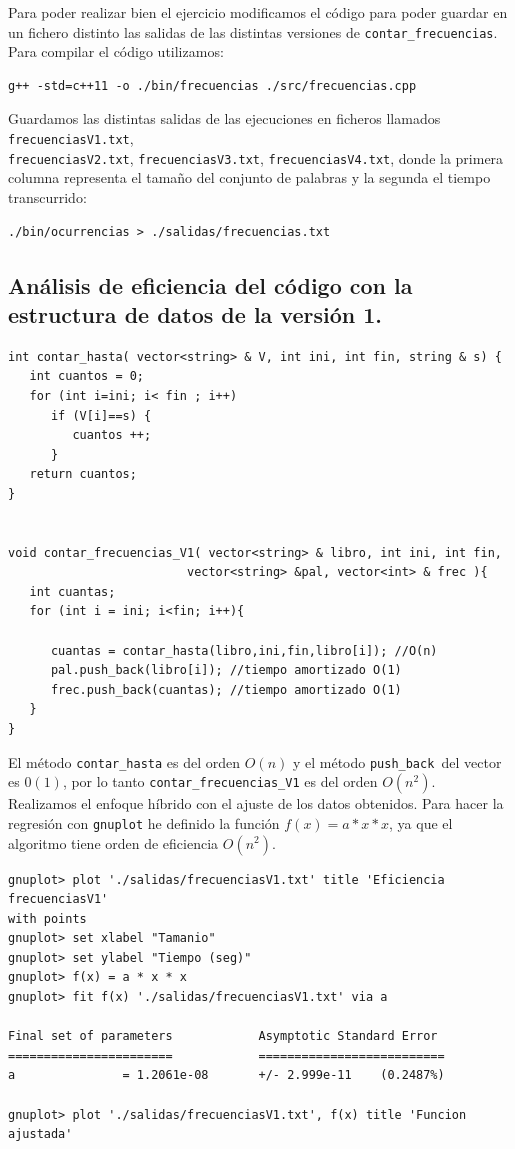 \documentclass[11pt]{article}
\begin{document}
Para poder realizar bien el ejercicio modificamos el código para poder guardar en un fichero distinto las salidas de las distintas versiones de \texttt{contar\_frecuencias}. Para compilar el código utilizamos:
\begin{verbatim}
g++ -std=c++11 -o ./bin/frecuencias ./src/frecuencias.cpp 
\end{verbatim}

Guardamos las distintas salidas de las ejecuciones en ficheros llamados \texttt{frecuenciasV1.txt},\\ \texttt{frecuenciasV2.txt}, \texttt{frecuenciasV3.txt}, \texttt{frecuenciasV4.txt}, donde la primera columna representa el tamaño del conjunto de palabras y la segunda el tiempo transcurrido:
\begin{verbatim}
./bin/ocurrencias > ./salidas/frecuencias.txt
\end{verbatim}

\subsection{Análisis de eficiencia del código con la estructura de datos de la versión 1.}

\begin{verbatim}
int contar_hasta( vector<string> & V, int ini, int fin, string & s) {
   int cuantos = 0;
   for (int i=ini; i< fin ; i++)
      if (V[i]==s) {
         cuantos ++;
      }
   return cuantos;
}


void contar_frecuencias_V1( vector<string> & libro, int ini, int fin,
                         vector<string> &pal, vector<int> & frec ){
   int cuantas;
   for (int i = ini; i<fin; i++){

      cuantas = contar_hasta(libro,ini,fin,libro[i]); //O(n)
      pal.push_back(libro[i]); //tiempo amortizado O(1)
      frec.push_back(cuantas); //tiempo amortizado O(1)
   }
}
\end{verbatim}

El método \texttt{contar\_hasta} es del orden $O(n)$ y el método \texttt{push\_back }del vector es $0(1)$, por lo tanto \texttt{contar\_frecuencias\_V1} es del orden $O(n^2)$.\\

Realizamos el enfoque híbrido con el ajuste de los datos obtenidos. Para hacer la regresión con \texttt{gnuplot} he definido la función $f(x) = a * x * x$, ya que el algoritmo tiene orden de eficiencia $O(n^2)$.

\begin{verbatim}
gnuplot> plot './salidas/frecuenciasV1.txt' title 'Eficiencia frecuenciasV1' 
with points
gnuplot> set xlabel "Tamanio"
gnuplot> set ylabel "Tiempo (seg)"
gnuplot> f(x) = a * x * x
gnuplot> fit f(x) './salidas/frecuenciasV1.txt' via a

Final set of parameters            Asymptotic Standard Error
=======================            ==========================
a               = 1.2061e-08       +/- 2.999e-11    (0.2487%)

gnuplot> plot './salidas/frecuenciasV1.txt', f(x) title 'Funcion ajustada'
\end{verbatim}
\end{document}
